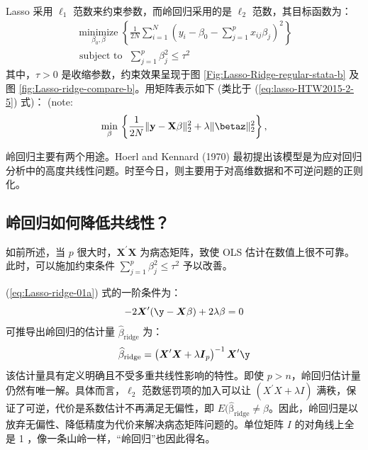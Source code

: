 Lasso 采用 $\ell_{1}$ 范数来约束参数，而岭回归采用的是 $\ell_{2}$ 范数，其目标函数为：
\begin{equation}\label{eq:Lasso-ridge-01}
	\begin{gathered}
	\underset{\beta_{0}, \beta}{\operatorname{minimize}}\left\{\frac{1}{2 N} \sum_{i=1}^{N}\left(y_{i}-\beta_{0}-\sum_{j=1}^{p} x_{i j} \beta_{j}\right)^{2}\right\} \\
	\text { subject to }\,\, \sum_{j=1}^{p} \beta_{j}^{2} \leq \tau^{2}
	\end{gathered} 
\end{equation}
其中，$\tau>0$ 是收缩参数，约束效果呈现于图 \ref{Fig:Lasso-Ridge-regular-stata-b} 及图 \ref{fig:Lasso-ridge-compare-b}。用矩阵表示如下 (类比于 (\ref{eq:lasso-HTW2015-2-5}) 式)： (note: %
\begin{equation}\label{eq:Lasso-ridge-01a}
\underset{\beta}{\operatorname{min}}\,
\left\{\frac{1}{2 N}\|\mathbf{y}-\mathbf{X} \beta\|_{2}^{2}+\lambda\|\betaz\|_{2}^2\right\},
\end{equation}






岭回归主要有两个用途。Hoerl and Kennard (1970) 最初提出该模型是为应对回归分析中的高度共线性问题。时至今日，则主要用于对高维数据和不可逆问题的正则化。

\subsection{岭回归如何降低共线性？}
如前所述，当 $p$ 很大时，$\boldsymbol{X}^{\prime} \boldsymbol{X}$ 为病态矩阵，致使 OLS 估计在数值上很不可靠。此时，可以施加约束条件 $\sum_{j=1}^{p} \beta_{j}^{2} \leq \tau^{2}$ 予以改善。

(\ref{eq:Lasso-ridge-01a}) 式的一阶条件为：
$$
-2 \boldsymbol{X}^{\prime}(\boldsymbol{\y}-\boldsymbol{X} \beta)+2 \lambda \beta=0
$$
可推导出岭回归的估计量 $\widehat{\beta}_{\text {ridge}}$ 为：
\begin{equation}\label{eq:Lasso-21}
	\widehat{\beta}_{\text {ridge}} =\left(\boldsymbol{X}^{\prime} \boldsymbol{X}+\lambda \boldsymbol{I}_{p}\right)^{-1} \boldsymbol{X}^{\prime} \boldsymbol{\y}
\end{equation}
该估计量具有定义明确且不受多重共线性影响的特性。即使 $p>n$，岭回归估计量仍然有唯一解。具体而言，$\ell_{2}$ 范数惩罚项的加入可以让 $\left(X^{\prime} X+\lambda I\right)$ 满秩，保证了可逆，代价是系数估计不再满足无偏性，即 $E(\mathrm{\widehat{\beta}_{\text {ridge}}} \neq \beta$。因此，岭回归是以放弃无偏性、降低精度为代价来解决病态矩阵问题的。单位矩阵 $I$ 的对角线上全是 1 ，像一条山岭一样，“岭回归”也因此得名。

